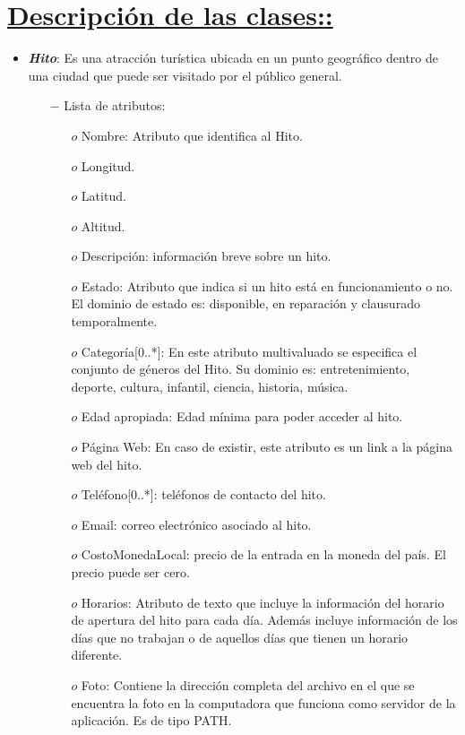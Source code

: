 \documentclass[a4paper]{article}
\begin{document}
\setlength{\parindent}{0,5cm}
\setlength{\parskip}{\baselineskip} 
\vspace{10 cm}





\section{\underline{Descripción de las clases::}}
 \setlength{\parindent}{0,5cm}
\setlength{\parskip}{\baselineskip} 



\begin{itemize}

\item{
	\textbf{\textit{Hito}}: Es una atracción turística ubicada en un punto geográfico dentro de una ciudad que puede ser visitado por el público general. 
  		
     \begin{itemize}   
  		\item[$-$] Lista de atributos:

	\begin{itemize}
		\item[$o$] Nombre: Atributo que identifica al Hito.
        \item[$o$] Longitud.
        \item[$o$] Latitud.
        \item[$o$] Altitud.
        \item[$o$] Descripción: información breve sobre un hito.
        \item[$o$] Estado: Atributo que indica si un hito está en funcionamiento o no. El dominio de estado es: disponible, en reparación y clausurado temporalmente.
        \item[$o$] Categoría[0..*]: En este atributo multivaluado se especifica el conjunto de géneros del Hito. Su dominio es: entretenimiento, deporte, cultura, infantil, ciencia, historia, música.
        \item[$o$] Edad apropiada: Edad mínima para poder acceder al hito.
\item[$o$] Página Web:  En caso de existir, este atributo es un link a la página web del hito.
\item[$o$] Teléfono[0..*]: teléfonos de contacto del hito.
\item[$o$] Email: correo electrónico asociado al hito.
\item[$o$] CostoMonedaLocal: precio de la entrada en la moneda del país. El precio puede ser cero.
\item[$o$] Horarios: Atributo de texto que incluye la información del horario de apertura del hito para cada día. Además incluye información de los días que no trabajan o de aquellos días que tienen un horario diferente.
\item[$o$] Foto: Contiene la dirección completa del archivo en el que se encuentra la foto en la computadora que funciona como servidor de la aplicación. Es de tipo PATH.


\end{itemize}
\end{itemize}}
\end{itemize}
\end{document}
